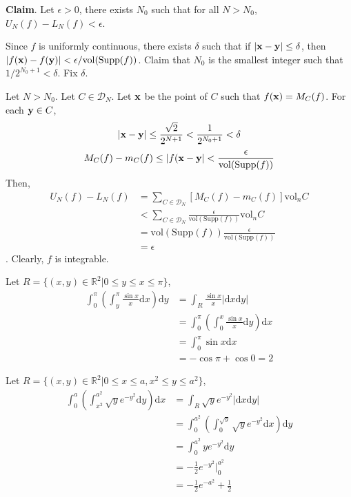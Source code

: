 \documentclass{homework}
\begin{document}
\begin{problem}{2}
\textbf{Claim}.
Let $\epsilon > 0$, there exists $N_0$ such that for all $N > N_0$,
$U_N(f) - L_N(f) < \epsilon$.

Since $f$ is uniformly continuous, there exists $\delta$ such that
if $|\mathbf{x} - \mathbf{y}| \leq \delta$, then
$|f(\mathbf{x}) - f(\mathbf{y})| < \epsilon / \mathrm{vol}(\mathrm{Supp}(f))$.
Claim that $N_0$ is the smallest integer such that $1 / 2^{N_0 + 1} < \delta$.
Fix $\delta$.

Let $N > N_0$. Let $C \in \mathcal{D}_N$. Let $\mathbf{x}$ be the point of $C$
such that $f(\mathbf{x}) = M_C(f)$. For each $\mathbf{y} \in C$,
$$|\mathbf{x} - \mathbf{y}| \leq \frac{\sqrt{2}}{2^{N+1}}
< \frac{1}{2^{N_0+1}} < \delta$$
$$   M_C(f) - m_C(f)
\leq |f(\mathbf{x} - \mathbf{y}|
<\frac{\epsilon}{\mathrm{vol}(\mathrm{Supp}(f))}$$
Then,
\begin{align*}
U_N(f) - L_N(f)
&= \sum_{C \in \mathcal{D}_N} [M_C(f) - m_C(f)]\mathrm{vol}_n C\\
&< \sum_{C \in \mathcal{D}_N} \frac{\epsilon}{\mathrm{vol}(\mathrm{Supp}(f))}
    \mathrm{vol}_n C\\
&= \mathrm{vol}(\mathrm{Supp}(f))
    \frac{\epsilon}{\mathrm{vol}(\mathrm{Supp}(f))}\\
&= \epsilon
\end{align*}
. Clearly, $f$ is integrable. \QED
\end{problem}

\begin{problem}{3}
Let $R = \{(x, y) \in \mathbb{R}^2 | 0 \leq y \leq x \leq \pi\}$,
\begin{align*}
\int_0^\pi(\int_y^\pi \frac{\sin x}{x} \mathrm{d}x)\mathrm{d}y
&= \int_R \frac{\sin x}{x} |\mathrm{d} x \mathrm{d} y| \\
&= \int_0^{\pi} (\int_0^x \frac{\sin x}{x} \mathrm{d}y) \mathrm{d}x \\
&= \int_0^{\pi} \sin x \mathrm{d}x \\
&= - \cos \pi + \cos 0  = 2
\end{align*}
\end{problem}

\begin{problem}{4}
Let $R = \{(x, y) \in \mathbb{R}^2 | 0 \leq x \leq a, x^2 \leq y \leq a^2\}$,
\begin{align*}
\int_0^a (\int_{x^2}^{a^2} \sqrt{y}e^{-y^2} \mathrm{d}y) \mathrm{d}x
&= \int_R \sqrt{y}e^{-y^2} |\mathrm{d}x \mathrm{d}y| \\
&= \int_0^{a^2} (\int_{0}^{\sqrt{y}} \sqrt{y}e^{-y^2} \mathrm{d}x) \mathrm{d}y \\
&= \int_0^{a^2} ye^{-y^2} \mathrm{d}y \\
&= -\frac{1}{2}e^{-y^2} |_0^{a^2} \\
&= -\frac{1}{2}e^{-a^2} + \frac{1}{2}
\end{align*}
\end{problem}
\end{document}
